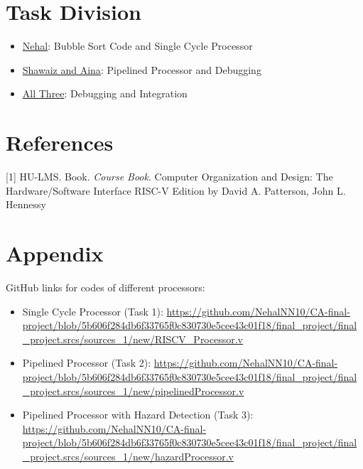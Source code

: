 \documentclass{report}
\begin{document}
\chapter{Task Division}
\begin{itemize}
    \item {\large \underline{Nehal}: Bubble Sort Code and Single Cycle Processor}
    \item {\large \underline{Shawaiz and Aina}: Pipelined Processor and Debugging}
    \item {\large \underline{All Three}: Debugging and Integration}
\end{itemize}

\chapter{References}

[1] HU-LMS. Book. \textit{Course Book}. Computer Organization and Design: The Hardware/Software Interface RISC-V Edition by David A. Patterson, John L. Hennessy

\appendix
\chapter{Appendix}

GitHub links for codes of different processors: 
\begin{itemize}
    \item Single Cycle Processor (Task 1): \url{https://github.com/NehalNN10/CA-final-project/blob/5b606f284db6f33765f0c830730e5cee43c01f18/final_project/final_project.srcs/sources_1/new/RISCV_Processor.v}
    \item Pipelined Processor (Task 2): \url{https://github.com/NehalNN10/CA-final-project/blob/5b606f284db6f33765f0c830730e5cee43c01f18/final_project/final_project.srcs/sources_1/new/pipelinedProcessor.v}
    \item Pipelined Processor with Hazard Detection (Task 3): \url{https://github.com/NehalNN10/CA-final-project/blob/5b606f284db6f33765f0c830730e5cee43c01f18/final_project/final_project.srcs/sources_1/new/hazardProcessor.v}
\end{itemize}
\end{document}
